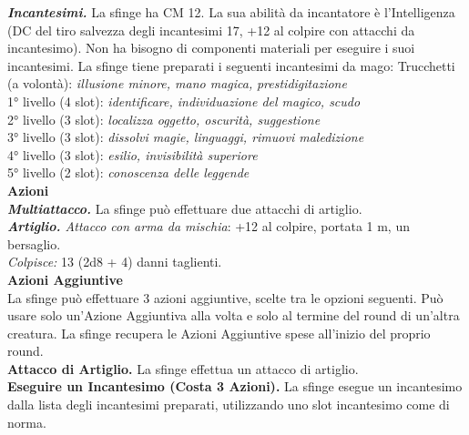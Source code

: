 \begin{multicols}{2}
\emph{\textbf{Incantesimi.}} La sfinge ha CM 12. La sua abilità da incantatore è l'Intelligenza (DC del tiro salvezza degli incantesimi 17, +12 al colpire con attacchi da incantesimo). Non ha bisogno di componenti materiali per eseguire i suoi incantesimi. La sfinge tiene preparati i seguenti incantesimi da mago: Trucchetti (a volontà): \emph{illusione minore, mano magica,} \emph{prestidigitazione}\\
1° livello (4 slot): \emph{identificare, individuazione del magico, scudo}\\
2° livello (3 slot): \emph{localizza oggetto, oscurità, suggestione}\\
3° livello (3 slot): \emph{dissolvi magie, linguaggi, rimuovi maledizione}\\
4° livello (3 slot): \emph{esilio, invisibilità superiore}\\
5° livello (2 slot): \emph{conoscenza delle leggende}\\
\smallskip\textbf{Azioni}\\
\emph{\textbf{Multiattacco.}} La sfinge può effettuare due attacchi di artiglio.\\
\emph{\textbf{Artiglio.} Attacco con arma da mischia}: +12 al colpire, portata 1 m, un bersaglio.\\
\emph{Colpisce:} 13 (2d8 + 4) danni taglienti.\\
\textbf{Azioni Aggiuntive}\\
La sfinge può effettuare 3 azioni aggiuntive, scelte tra le opzioni seguenti. Può usare solo un'Azione Aggiuntiva alla volta e solo al termine del round di un'altra creatura. La sfinge recupera le Azioni Aggiuntive spese all'inizio del proprio round. \\
\textbf{Attacco di Artiglio.} La sfinge effettua un attacco di artiglio.\\
\textbf{Eseguire un Incantesimo (Costa 3 Azioni).} La sfinge esegue un incantesimo dalla lista degli incantesimi preparati, utilizzando uno slot incantesimo come di norma.\\


\end{multicols}
